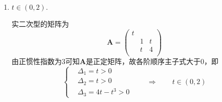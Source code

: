 \begin{enumerate}
    \item \( t \in (0, 2).\)\[\]
    
    实二次型的矩阵为\[\boldsymbol{A} = \begin{pmatrix}
        t & & \\ & 1 & t \\ & t & 4\\
    \end{pmatrix}\]
    由正惯性指数为\(3\)可知\(\boldsymbol{A}\)是正定矩阵，故各阶顺序主子式大于\(0\)，即\[\left\{\begin{aligned}
        &\Delta_1 = t > 0\\ &\Delta_2 = t > 0\\ & \Delta_3 = 4t - t^3 > 0
    \end{aligned}  \right. \qquad \Longrightarrow\qquad t \in (0, 2)\]




\end{enumerate}